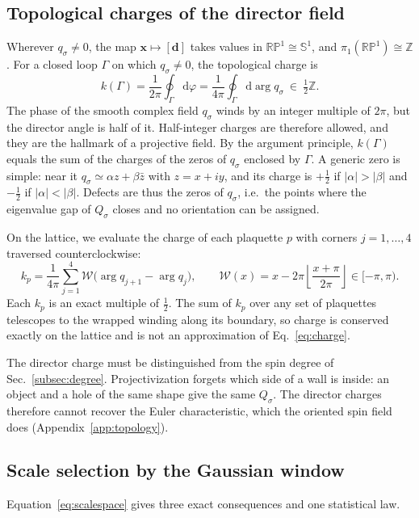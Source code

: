 \documentclass[11pt,a4paper]{article}
\newcommand{\dd}{\mathrm{d}}
\newcommand{\RP}{\mathbb{RP}}
\newcommand{\Sn}{\mathbb S}
\begin{document}
\subsection{Topological charges of the director field}\label{subsec:charge}
Wherever $q_\sigma\neq0$, the map $\bm x\mapsto[\bm d]$ takes values in $\RP^1\cong\Sn^1$, and $\pi_1(\RP^1)\cong\mathbb Z$. For a closed loop $\Gamma$ on which $q_\sigma\neq0$, the topological charge is
\begin{equation}
 k(\Gamma)=\frac1{2\pi}\oint_\Gamma\dd\varphi=\frac1{4\pi}\oint_\Gamma\dd\arg q_\sigma\ \in\ \tfrac12\mathbb Z .
 \label{eq:charge}
\end{equation}
The phase of the smooth complex field $q_\sigma$ winds by an integer multiple of $2\pi$, but the director angle is half of it. Half-integer charges are therefore allowed, and they are the hallmark of a projective field. By the argument principle, $k(\Gamma)$ equals the sum of the charges of the zeros of $q_\sigma$ enclosed by $\Gamma$. A generic zero is simple: near it $q_\sigma\simeq\alpha z+\beta\bar z$ with $z=x+iy$, and its charge is $+\tfrac12$ if $|\alpha|>|\beta|$ and $-\tfrac12$ if $|\alpha|<|\beta|$. Defects are thus the zeros of $q_\sigma$, i.e.\ the points where the eigenvalue gap of $Q_\sigma$ closes and no orientation can be assigned.

On the lattice, we evaluate the charge of each plaquette $p$ with corners $j=1,\dots,4$ traversed counterclockwise:
\begin{equation}
 k_p=\frac1{4\pi}\sum_{j=1}^{4}\mathcal W\bigl(\arg q_{j+1}-\arg q_j\bigr),\qquad
 \mathcal W(x)=x-2\pi\left\lfloor\frac{x+\pi}{2\pi}\right\rfloor\in[-\pi,\pi).
 \label{eq:latticecharge}
\end{equation}
Each $k_p$ is an exact multiple of $\tfrac12$. The sum of $k_p$ over any set of plaquettes telescopes to the wrapped winding along its boundary, so charge is conserved exactly on the lattice and is not an approximation of Eq.~\eqref{eq:charge}.

The director charge must be distinguished from the spin degree of Sec.~\ref{subsec:degree}. Projectivization forgets which side of a wall is inside: an object and a hole of the same shape give the same $Q_\sigma$. The director charges therefore cannot recover the Euler characteristic, which the oriented spin field does (Appendix~\ref{app:topology}).

\subsection{Scale selection by the Gaussian window}\label{subsec:scale}
Equation~\eqref{eq:scalespace} gives three exact consequences and one statistical law.
\end{document}
